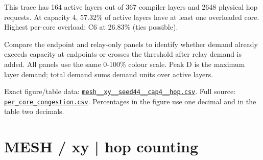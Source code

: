 \documentclass[10pt,a4paper]{article}
\begin{document}
This trace has 164 active layers out of 367 compiler layers and 2648 physical hop requests. At capacity 4, 57.32\% of active layers have at least one overloaded core. Highest per-core overload: C6 at 26.83\% (ties possible).\par
Compare the endpoint and relay-only panels to identify whether demand already exceeds capacity at endpoints or crosses the threshold after relay demand is added. All panels use the same 0-100\% colour scale. Peak D is the maximum layer demand; total demand sums demand units over active layers.\par
Exact figure/table data: \href{\detokenize{file:///home/dhruv-pansuriya/Documents/BTP/Compiler-Driven-ACE/output/pdf/qaoa_methods_congestion/tables/mesh__xy__seed44__cap4__hop.csv}}{\nolinkurl{mesh__xy__seed44__cap4__hop.csv}}. Full source: \href{\detokenize{file:///home/dhruv-pansuriya/Documents/BTP/Compiler-Driven-ACE/results/qaoa_2seed_2026-10-26/congestion/per_core_congestion.csv}}{\nolinkurl{per_core_congestion.csv}}. Percentages in the figure use one decimal and in the table two decimals.\par
\clearpage
\section*{MESH / xy | hop counting}
\end{document}
